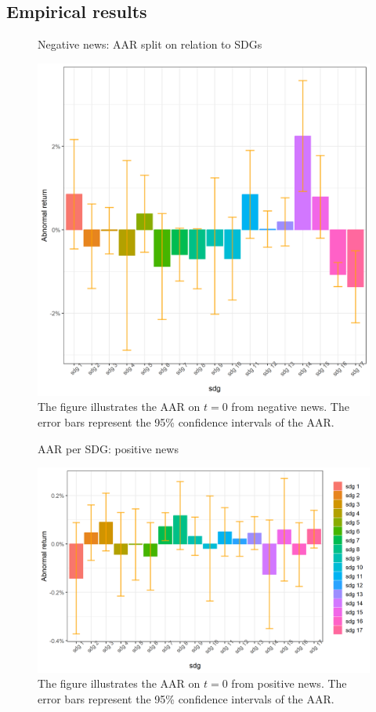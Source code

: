 
\subsection{Empirical results}

\begin{figure} [H]
    \centering
    \caption{Negative news: AAR split on relation to SDGs}
    \includegraphics[scale=0.6]{Projekt/1.Figures analysis/ST_negative_sdg_bar.png}
    \caption*{\footnotesize The figure illustrates the AAR on $t = 0$ from negative news. The error bars represent the 95\% confidence intervals of the AAR.}
    \label{fig:ST_neg_bar_all}
\end{figure}

\begin{figure} [H]
    \centering
    \caption{AAR per SDG: positive news}
    \includegraphics[scale=0.6]{Projekt/1.Figures analysis/ST_positive_sdg_bar.png}
    \caption*{\footnotesize The figure illustrates the AAR on $t = 0$ from positive news. The error bars represent the 95\% confidence intervals of the AAR.}
    \label{fig:ST_pos_bar_all}
\end{figure}

